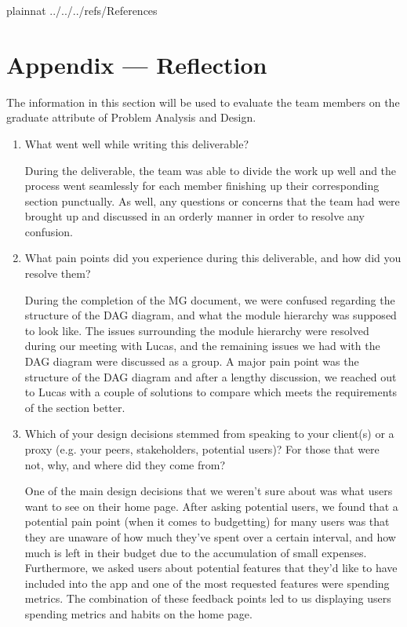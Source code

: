 \documentclass[12pt, titlepage]{article}
\begin{document}



 {plainnat}
 {../../../refs/References}

\newpage


\newpage{}

\section*{Appendix --- Reflection}

The information in this section will be used to evaluate the team members on the
graduate attribute of Problem Analysis and Design.



\begin{enumerate}
  \item What went well while writing this deliverable? 

  During the deliverable, the team was able to divide the work up well and the process went seamlessly for each member finishing up their corresponding section punctually. 
  As well, any questions or concerns that the team had were brought up and discussed in an orderly manner in order to resolve any confusion. 

  \item What pain points did you experience during this deliverable, and how
    did you resolve them?

    During the completion of the MG document, we were confused regarding the structure of the DAG diagram, and what the module hierarchy was supposed to look like. The issues surrounding the module
    hierarchy were resolved during our meeting with Lucas, and the remaining issues we had with the DAG diagram were discussed as a group. A major pain point was the structure of the DAG diagram
    and after a lengthy discussion, we reached out to Lucas with a couple of solutions to compare which meets the requirements of the section better.

  \item Which of your design decisions stemmed from speaking to your client(s)
  or a proxy (e.g. your peers, stakeholders, potential users)? For those that
  were not, why, and where did they come from?

  One of the main design decisions that we weren't sure about was what users want to see on their home page. After asking potential users, we found that a potential pain point (when it comes to 
  budgetting) for many users was that they are unaware of how much they've spent over a certain interval, and how much is left in their budget due to the accumulation of small expenses. 
  Furthermore, we asked users about potential features that they'd like to have included into the app and one of the most requested features were spending metrics. The combination of these feedback
  points led to us displaying users spending metrics and habits on the home page. 


\end{enumerate}
\end{document}
